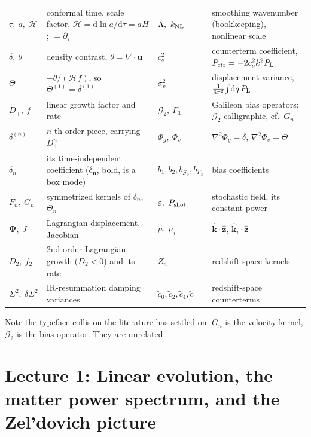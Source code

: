 \documentclass[a4paper,11pt]{article}
\newcommand{\vu}{\bm{u}}
\newcommand{\vPsi}{\bm{\Psi}}
\newcommand{\nhat}{\hat{\bm{z}}}
\newcommand{\khat}{\hat{\bm{k}}}
\def\cH{\mathcal{H}}
\def\Plin{P_{\rm L}}
\def\knl{k_{\rm NL}}
\newcommand{\dd}{\mathrm{d}}
\def\G{\mathcal{G}}
\numberwithin{equation}{section}
\newcounter{exercise}[section]
\begin{document}
\begin{center}
\small
\begin{tabular}{@{}ll@{\hspace{2em}}ll@{}}
\toprule
$\tau,\ a,\ \cH$ & conformal time, scale factor, $\cH = \dd\ln a/\dd\tau = aH$; $\dot{} = \partial_\tau$
  & $\Lambda,\ \knl$ & smoothing wavenumber (bookkeeping), nonlinear scale \\
$\delta,\ \theta$ & density contrast, $\theta=\nabla\cdot\vu$
  & $c_s^2$ & counterterm coefficient, $P_{\rm ctr} = -2c_s^2k^2\Plin$ \\
$\Theta$ & $-\theta/(\cH f)$, so $\Theta^{(1)}=\delta^{(1)}$
  & $\sigma_v^2$ & displacement variance, $\tfrac{1}{6\pi^2}\!\int\!\dd q\,\Plin$ \\
$D_+,\ f$ & linear growth factor and rate
  & $\G_2,\ \Gamma_3$ & Galileon bias operators; $\G_2$ calligraphic, cf.\ $G_n$ \\
$\delta^{(n)}$ & $n$-th order piece, carrying $D_+^n$
  & $\Phi_g,\ \Phi_v$ & $\nabla^2\Phi_g=\delta$, $\nabla^2\Phi_v=\Theta$ \\
$\delta_n$ & its time-independent coefficient ($\delta_{\bm{n}}$, bold, is a box mode)
  & $b_1,b_2,b_{\G_2},b_{\Gamma_3}$ & bias coefficients \\
$F_n,\ G_n$ & symmetrized kernels of $\delta_n$, $\Theta_n$
  & $\varepsilon,\ P_{\rm shot}$ & stochastic field, its constant power \\
$\vPsi,\ J$ & Lagrangian displacement, Jacobian
  & $\mu,\ \mu_i$ & $\khat\cdot\nhat$, $\khat_i\cdot\nhat$ \\
$D_2,\ f_2$ & 2nd-order Lagrangian growth ($D_2<0$) and its rate
  & $Z_n$ & redshift-space kernels \\
$\Sigma^2,\ \delta\Sigma^2$ & IR-resummation damping variances
  & $\tilde c_0,\tilde c_2,\tilde c_4,\tilde c$ & redshift-space counterterms \\
\bottomrule
\end{tabular}
\end{center}

\medskip
\noindent Note the typeface collision the literature has settled on: $G_n$ is the velocity kernel, $\G_2$ is the bias operator. They are unrelated.

\tableofcontents

\section*{Lecture 1: Linear evolution, the matter power spectrum, and the Zel'dovich picture}
\setcounter{section}{1}
\setcounter{subsection}{0}
\setcounter{equation}{0}
\setcounter{exercise}{0}
\end{document}
